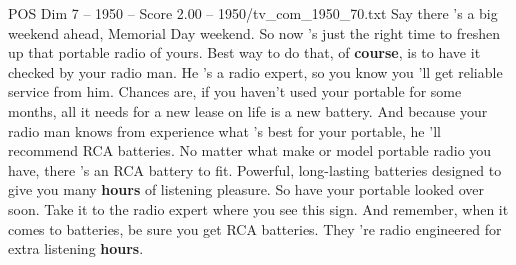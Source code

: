 \begin{textsample}{POS Dim 7 – 1950 – Score 2.00 – 1950/tv\_com\_1950\_70.txt}  \label{ex:f7_pos_017}
Say there 's a big weekend ahead, Memorial Day weekend.
So now 's just the right time to freshen up that portable radio of yours.
Best way to do that, of \textbf{course}, is to have it checked by your radio man.
He 's a radio expert, so you know you 'll get reliable service from him.
Chances are, if you haven't used your portable for some months, all it needs for a new lease on life is a new battery.
And because your radio man knows from experience what 's best for your portable, he 'll recommend RCA batteries.
No matter what make or model portable radio you have, there 's an RCA battery to fit.
Powerful, long-lasting batteries designed to give you many \textbf{hours} of listening pleasure.
So have your portable looked over soon.
Take it to the radio expert where you see this sign.
And remember, when it comes to batteries, be sure you get RCA batteries.
They 're radio engineered for extra listening \textbf{hours}.

\end{textsample}
